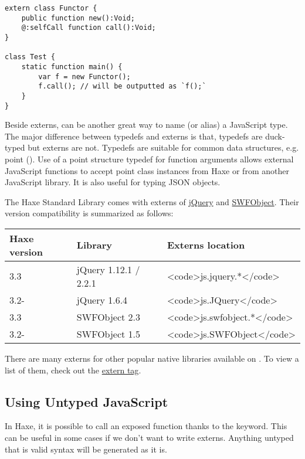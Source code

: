 \begin{lstlisting}
extern class Functor {
	public function new():Void;
	@:selfCall function call():Void;
}

class Test {
	static function main() {
		var f = new Functor();
		f.call(); // will be outputted as `f();`
	}
}
\end{lstlisting}

Beside externs,  can be another great way to name (or alias) a JavaScript type. The major difference between typedefs and externs is that, typedefs are duck-typed but externs are not. Typedefs are suitable for common data structures, e.g. point (). Use of a point structure typedef for function arguments allows external JavaScript functions to accept point class instances from Haxe or from another JavaScript library. It is also useful for typing JSON objects.

The Haxe Standard Library comes with externs of \href{https://jquery.com/}{jQuery} and \href{http://blog.deconcept.com/swfobject/}{SWFObject}. Their version compatibility is summarized as follows:

\begin{center}
\begin{tabular}{| l | l | l |}
	\hline
	Haxe version & Library               & Externs location \\ \hline
	3.3          & jQuery 1.12.1 / 2.2.1 & <code>js.jquery.*</code> \\
	3.2-         & jQuery 1.6.4          & <code>js.JQuery</code> \\
	3.3          & SWFObject 2.3         & <code>js.swfobject.*</code> \\
	3.2-         & SWFObject 1.5         & <code>js.SWFObject</code> \\ \hline
\end{tabular}
\end{center}

There are many externs for other popular native libraries available on . To view a list of them, check out the \href{http://lib.haxe.org/t/extern/}{extern tag}.

\subsection{Using Untyped JavaScript}
\label{target-javascript-injection}

In Haxe, it is possible to call an exposed function thanks to the  keyword. This can be useful in some cases if we don't want to write externs. Anything untyped that is valid syntax will be generated as it is.

